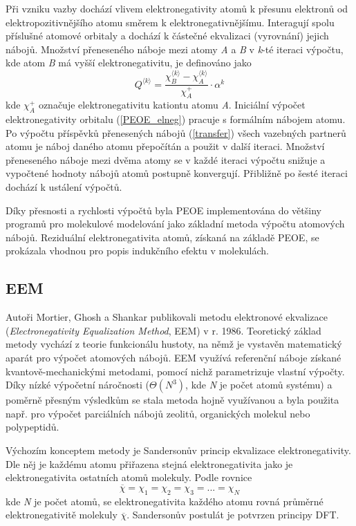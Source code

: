 Při vzniku vazby dochází vlivem elektronegativity atomů k přesunu elektronů od elektropozitivnějšího atomu směrem k elektronegativnějšímu. Interagují spolu přísluš\-né atomové orbitaly a dochází k částečné ekvalizaci (vyrovnání) jejich nábojů. Množ\-ství přeneseného náboje mezi atomy \textit{A} a \textit{B} v \textit{k}-té iteraci výpočtu, kde atom \textit{B} má vyšší elektronegativitu, je definováno jako 
\begin{equation}
\label{transfer}
    Q^{\langle k \rangle} = \frac{\chi_B^{\langle k \rangle} - \chi_A^{\langle k \rangle}}{\chi_A^+} \cdot \alpha^k
\end{equation}
kde $\chi_A^+$ označuje elektronegativitu kationtu atomu \textit{A}. Iniciální výpočet elektronegativity orbitalu (\ref{PEOE_elneg}) pracuje s formálním nábojem atomu. Po výpočtu příspěvků přenesených nábojů (\ref{transfer}) všech vazebných partnerů atomu je náboj daného atomu přepočítán a použit v další iteraci. Množství přeneseného náboje mezi dvěma atomy se v každé iteraci výpočtu snižuje a vypočtené hodnoty nábojů atomů postupně konvergují. Přibližně po šesté iteraci dochází k ustálení výpočtů. 

Díky přesnosti a rychlosti výpočtů byla PEOE implementována do většiny programů pro molekulové modelování jako základní metoda výpočtu atomových nábojů. Reziduální elektronegativita atomů, získaná na základě PEOE, se prokázala vhodnou pro popis indukčního efektu v molekulách. 

\subsection{EEM}
Autoři Mortier, Ghosh a Shankar publikovali metodu elektronové ekvalizace (\textit{Electronegativity Equalization Method}, EEM) v r. 1986. Teoretický základ metody vychází z teorie funkcionálu hustoty, na němž je vystavěn matematický aparát pro výpočet atomových nábojů. EEM využívá referenční náboje získané kvantově-mechanickými metodami, pomocí nichž parametrizuje vlastní výpočty. Díky nízké výpočetní náročnosti ($\Theta(N^3)$, kde \textit{N} je počet atomů systému) a poměrně přesným výsledkům se stala metoda hojně využívanou a byla použita např. pro výpočet parciálních nábojů zeolitů, organických molekul nebo polypeptidů.

Výchozím konceptem metody je Sandersonův princip ekvalizace elektronegativity. Dle něj je každému atomu přiřazena stejná elektronegativita jako je elektronegativita ostatních atomů molekuly. Podle rovnice 
\begin{equation}
\label{Sanders}
    \overline{\chi} = \chi_1 = \chi_2 = \chi_3 = ... = \chi_N
\end{equation}
kde \textit{N} je počet atomů, se elektronegativita každého atomu rovná průměrné elektronegativitě molekuly $\overline{\chi}$. Sandersonův postulát je potvrzen principy DFT. %

